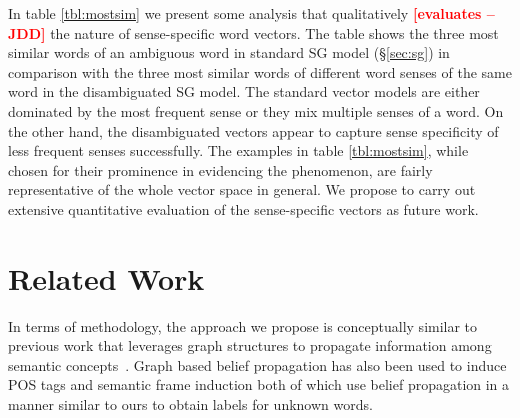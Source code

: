 \documentclass[11pt]{article}
\newcommand{\jdd}[1]{\textcolor{red}{\bf\small [#1 --JDD]}}
\begin{document}
In table \ref{tbl:mostsim} we present some analysis that qualitatively  \jdd{evaluates} the nature of 
sense-specific word vectors. The table shows the three most similar words of an ambiguous word in standard SG model (\S\ref{sec:sg}) in comparison with the three most similar words of different word senses of the same word in the disambiguated SG model. 
The standard vector models %
are either dominated by the most frequent sense or they mix multiple senses of a word. 
On the other hand, the disambiguated vectors appear to capture sense specificity of less frequent senses successfully. The examples in table \ref{tbl:mostsim}, while chosen for their prominence in evidencing the phenomenon, are fairly representative of the whole vector space in general. We propose to carry out
extensive quantitative evaluation of the sense-specific vectors as future work.

\section{Related Work}

In terms of methodology, the approach we propose is conceptually similar to previous work that leverages graph 
structures to propagate information among semantic concepts~\cite{Zhu:2005:SLG:1104523,10.1109/TPAMI.2007.70765}. 
Graph based belief propagation has also been used to induce POS tags
\cite{Subramanya:2010:EGS:1870658.1870675,das-petrov:2011:ACL-HLT2011}
and semantic frame induction \cite{das-smith:2011:ACL-HLT2011} both of
which use belief propagation in a manner similar to ours to obtain
labels for unknown words.
\end{document}
